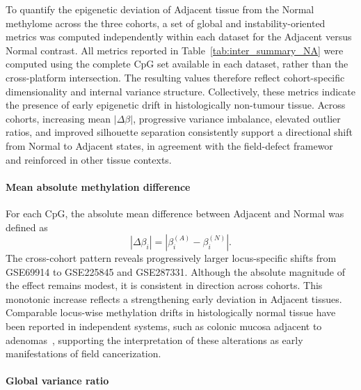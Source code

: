 To quantify the epigenetic deviation of Adjacent tissue from the Normal methylome across the three cohorts, a set of global and instability-oriented metrics was computed independently within each dataset for the Adjacent versus Normal contrast.
All metrics reported in Table~\ref{tab:inter_summary_NA} were computed using the complete CpG set available in each dataset, rather than the cross-platform intersection. The resulting values therefore reflect cohort-specific dimensionality and internal variance structure.
Collectively, these metrics indicate the presence of early epigenetic drift in histologically non-tumour tissue. Across cohorts, increasing mean $|\Delta\beta|$, progressive variance imbalance, elevated outlier ratios, and improved silhouette separation consistently support a directional shift from Normal to Adjacent states, in agreement with the field-defect framewor~\cite{Teschendorff2016} and reinforced in other tissue contexts.

\paragraph{Mean absolute methylation difference}  

For each CpG, the absolute mean difference between Adjacent and Normal was defined as
\begin{equation}
|\Delta\beta_i| = \left| \beta^{(A)}_i - \beta^{(N)}_i \right|.
\label{eq:mean_abs_delta_beta}
\end{equation}
The cross-cohort pattern reveals progressively larger locus-specific shifts from GSE69914 to GSE225845 and GSE287331.  
Although the absolute magnitude of the effect remains modest, it is consistent in direction across cohorts.  
This monotonic increase reflects a strengthening early deviation in Adjacent tissues. Comparable locus-wise methylation drifts in histologically normal tissue have been reported in independent systems, such as colonic mucosa adjacent to adenomas~\cite{Yates2024_NormalMucosaField}, supporting the interpretation of these alterations as early manifestations of field cancerization.

\paragraph{Global variance ratio}  

